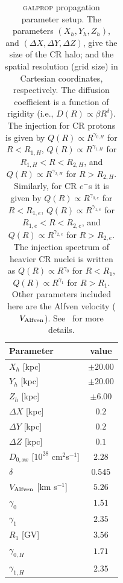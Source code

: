 \documentclass[doublespace,nopageskip]{VTthesis} %
\begin{document}
\begin{table}[htb!]
\centering
\caption{\textsc{galprop} propagation parameter setup. The parameters $(X_h, Y_h, Z_h)$, and $(\Delta X, \Delta Y, \Delta Z)$, give the size of the CR halo; and the spatial resolution (grid size) in Cartesian coordinates, respectively. The diffusion coefficient is a function of rigidity (i.e., $D(R) \propto \beta R^{\delta}$). The injection for CR protons is given by $Q(R) \propto R^{\gamma_{0,H}}$ for $R < R_{1,H}$, $Q(R) \propto R^{\gamma_{1,H}}$ for $R_{1,H} < R < R_{2,H}$, and $Q(R) \propto R^{\gamma_{2,H}}$ for $R > R_{2,H}$. Similarly, for CR $e^-$s it is given by $Q(R) \propto R^{\gamma_{0,e}}$ for $R < R_{1,e}$, $Q(R) \propto R^{\gamma_{1,e}}$ for $R_{1,e} < R < R_{2,e}$, and $Q(R) \propto R^{\gamma_{2,e}}$ for $R > R_{2,e}$. The injection spectrum of heavier  CR nuclei is written as $Q(R) \propto R^{\gamma_0}$ for $R < R_1$, $Q(R) \propto R^{\gamma_1}$ for $ R > R_1$. Other parameters included here are the Alfven velocity ($V_{\rm Alfven}$). See~\citet{Johannesson:2018bit} for more details.}
\begin{tabular}{lc}
\toprule
Parameter                                              & value\\\hline
$X_h$ [kpc]                                            & $\pm 20.00$\\
$Y_h$ [kpc]                                            & $\pm 20.00$\\
$Z_h$ [kpc]                                            & $\pm 6.00$\\
$\Delta X$ [kpc]                                       & $0.2$\\
$\Delta Y$ [kpc]                                       & $0.2$\\
$\Delta Z$ [kpc]                                       & $0.1$\\
$D_{0,xx}$ [$10^{28}$ cm$^2$s$^{-1}$]                  & $2.28$\\
$\delta$                              & $0.545$\\
$V_{\rm Alfven}$ [km s$^{-1}$]                         & $5.26$ \\
$\gamma_0$                            & $1.51$ \\
$\gamma_1$                            & $2.35$\\
$R_1$ [GV]                            & $3.56$\\
$\gamma_{0,H}$                        & $1.71$\\
$\gamma_{1,H}$                        & $2.35$\\

\end{tabular}
\end{table}
\end{document}
